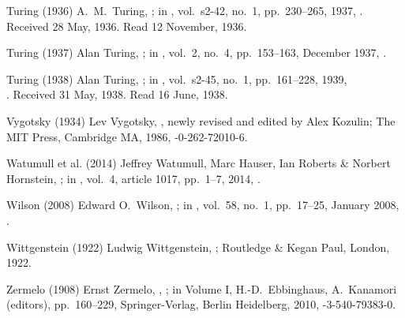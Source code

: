 \biblabel Turing (1936)
A.\ M.\ Turing,
;
in ,
vol.\ s2-42, no.\ 1, pp.\ 230--265, 1937,
.
Received 28 May, 1936. Read 12 November, 1936.

\biblabel Turing (1937)
Alan Turing,
; in
,
vol.\ 2, no.\ 4, pp.\ 153--163, December 1937,
.

\biblabel Turing (1938)
Alan Turing,
;
in ,
vol.\ s2-45, no.\ 1, pp.\ 161--228, 1939,\\
.
Received 31 May, 1938. Read 16 June, 1938.

\biblabel Vygotsky (1934)
Lev Vygotsky,
,
newly revised and edited by Alex Kozulin;
The MIT Press, Cambridge MA, 1986,
-0-262-72010-6.

\biblabel Watumull et al. (2014)
Jeffrey Watumull, Marc Hauser, Ian Roberts \& Norbert Hornstein,
; in
,
vol.\ 4, article 1017, pp.\ 1--7, 2014,
.

\biblabel Wilson (2008)
Edward O.\ Wilson,
;
in ,
vol.\ 58, no.\ 1, pp.\ 17--25, January 2008,
.

\biblabel Wittgenstein (1922)
Ludwig Wittgenstein,
;
Routledge \& Kegan Paul, London, 1922.

\biblabel Zermelo (1908)
Ernst Zermelo,
,
;
in  Volume I,
H.-D.\ Ebbinghaus, A.\ Kanamori (editors),
pp.\ 160--229,
Springer-Verlag, Berlin Heidelberg, 2010,
-3-540-79383-0.

\endinput
